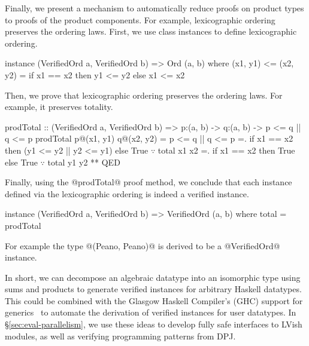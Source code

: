 Finally, we present a mechanism to automatically
reduce proofs on product types to proofs of the product components.
%
For example, lexicographic ordering preserves the ordering laws.
%
First, we use class instances to define lexicographic ordering.
%
\begin{mcode}
  instance (VerifiedOrd a, VerifiedOrd b) => Ord (a, b) where
    (x1, y1) <= (x2, y2) = if x1 == x2 then y1 <= y2 else x1 <= x2
\end{mcode}
%
Then, we prove that lexicographic ordering
preserves the ordering laws.
%
For example, it preserves totality.
%
\begin{mcode}
  prodTotal :: (VerifiedOrd a, VerifiedOrd b)
            => p:(a, b) -> q:(a, b) -> {p <= q || q <= p}
  prodTotal p@(x1, y1) q@(x2, y2)
   =  p <= q || q <= p
   =. if x1 == x2 then (y1 <= y2 || y2 <= y1) else True 
      $\because$ total x1 x2
   =. if x1 == x2 then True                   else True 
      $\because$ total y1 y2
   ** QED
\end{mcode}
%
Finally, using the @prodTotal@ proof method,
we conclude that each instance defined via the lexicographic
ordering is indeed a verified instance.
%
\begin{mcode}
  instance (VerifiedOrd a, VerifiedOrd b) 
         => VerifiedOrd (a, b) where
    total   = prodTotal
\end{mcode}
%
For example the type @(Peano, Peano)@ is derived to be a @VerifiedOrd@ instance.

In short, we can decompose an algebraic datatype into an isomorphic type using sums and
products to generate verified instances for arbitrary Haskell
datatypes. This could be combined with the Glasgow Haskell Compiler's (GHC) support
for generics~\cite{ghc-generics} to automate the derivation of verified instances
for user datatypes.
In \S\ref{sec:eval-parallelism}, we use these ideas to develop fully safe
interfaces to LVish modules, as well as verifying programming patterns from DPJ.
